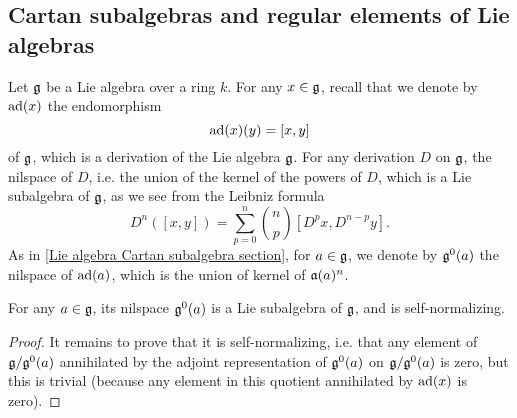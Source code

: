 \subsection{Cartan subalgebras and regular elements of Lie algebras}
Let $\mathfrak{g}$ be a Lie algebra over a ring $k$. For any $x\in\mathfrak{g}$, recall that we denote by $\mathrm{ad}(x)$ the endomorphism
\[\mathrm{ad}(x)(y)=[x,y]\]
of $\mathfrak{g}$, which is a derivation of the Lie algebra $\mathfrak{g}$. For any derivation $D$ on $\mathfrak{g}$, the nilspace of $D$, i.e. the union of the kernel of the powers of $D$, which is a Lie subalgebra of $\mathfrak{g}$, as we see from the Leibniz formula
\[D^n([x,y])=\sum_{p=0}^{n}\binom{n}{p}[D^px,D^{n-p}y].\]
As in \autoref{Lie algebra Cartan subalgebra section}, for $a\in\mathfrak{g}$, we denote by $\mathfrak{g}^0(a)$ the nilspace of $\mathrm{ad}(a)$, which is the union of kernel of $\mathfrak{a}(a)^n$.

\begin{proposition}\label{scheme group Lie algebra nilspace self-normalizing}
For any $a\in\mathfrak{g}$, its nilspace $\mathfrak{g}^0(a)$ is a Lie subalgebra of $\mathfrak{g}$, and is self-normalizing.
\end{proposition}
\begin{proof}
It remains to prove that it is self-normalizing, i.e. that any element of $\mathfrak{g}/\mathfrak{g}^0(a)$ annihilated by the adjoint representation of $\mathfrak{g}^0(a)$ on $\mathfrak{g}/\mathfrak{g}^0(a)$ is zero, but this is trivial (because any element in this quotient annihilated by $\mathrm{ad}(x)$ is zero).
\end{proof}


